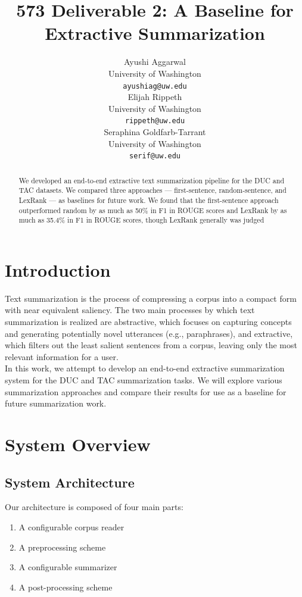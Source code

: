 \documentclass[11pt]{article}
\title{573 Deliverable 2: A Baseline for Extractive Summarization}
\author{Ayushi Aggarwal  \\
  University of Washington \\
  {\tt ayushiag@uw.edu} \\\And
  Elijah Rippeth \\
  University of Washington \\
  {\tt rippeth@uw.edu} \\\And
  Seraphina Goldfarb-Tarrant \\
  University of Washington\\
  {\tt serif@uw.edu} \\}
\date{}
\begin{document}
\maketitle
\begin{abstract}
  We developed an end-to-end extractive text summarization pipeline for the DUC and TAC datasets. We compared three approaches --- first-sentence, random-sentence, and LexRank --- as baselines for future work. We found that the first-sentence approach outperformed random by as much as 50\% in F1 in ROUGE scores and LexRank by as much as 35.4\% in F1 in ROUGE scores, though LexRank generally was judged 
\end{abstract}

\section{Introduction}

Text summarization is the process of compressing a corpus into a compact form with near equivalent saliency. The two main processes by which text summarization is realized are abstractive, which focuses on capturing concepts and generating potentially novel utterances (e.g., paraphrases), and extractive, which filters out the least salient sentences from a corpus, leaving only the most relevant information for a user. \\

In this work, we attempt to develop an end-to-end extractive summarization system for the DUC and TAC summarization tasks. We will explore various summarization approaches and compare their results for use as a baseline for future summarization work.

\section{System Overview}
\subsection{System Architecture}

Our architecture is composed of four main parts:

\begin{enumerate}
\item A configurable corpus reader
\item A preprocessing scheme
\item A configurable summarizer 
\item A post-processing scheme
\end{enumerate}
\end{document}

